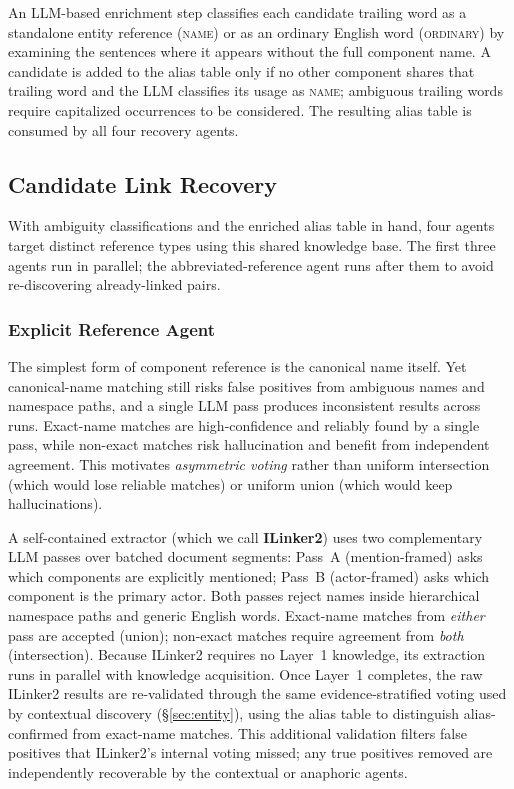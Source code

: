An LLM-based enrichment step classifies each candidate trailing
word as a standalone entity reference (\textsc{name}) or as an
ordinary English word (\textsc{ordinary}) by examining the
sentences where it appears without the full component name.
A candidate is added to the alias table only if no other
component shares that trailing word and the LLM classifies
its usage as \textsc{name};
ambiguous trailing words require capitalized occurrences
to be considered.
The resulting alias table is consumed by all four recovery agents.


\subsection{Candidate Link Recovery}\label{sec:recovery}

With ambiguity classifications and the enriched alias table in hand,
four agents target distinct reference types using this shared
knowledge base.
The first three agents run in parallel; the abbreviated-reference
agent runs after them to avoid re-discovering already-linked pairs.

\subsubsection{Explicit Reference Agent}\label{sec:seed}

The simplest form of component reference is the canonical name itself.
Yet canonical-name matching still risks false positives from ambiguous
names and namespace paths, and a single LLM pass produces
inconsistent results across runs.
Exact-name matches are high-confidence and reliably found by a
single pass, while non-exact matches risk hallucination and benefit
from independent agreement.
This motivates \emph{asymmetric voting} rather than uniform
intersection (which would lose reliable matches) or uniform union
(which would keep hallucinations).

A self-contained extractor (which we call \textbf{ILinker2}) uses two
complementary LLM passes over batched document segments:
Pass~A (mention-framed) asks which components are explicitly
mentioned; Pass~B (actor-framed) asks which component is the
primary actor.
Both passes reject names inside hierarchical namespace paths and
generic English words.
Exact-name matches from \emph{either} pass are accepted (union);
non-exact matches require agreement from \emph{both}
(intersection).
Because ILinker2 requires no Layer~1 knowledge, its extraction
runs in parallel with knowledge acquisition.
Once Layer~1 completes, the raw ILinker2 results are
re-validated through the same evidence-stratified voting used by
contextual discovery (\S\ref{sec:entity}), using the alias table
to distinguish alias-confirmed from exact-name matches.
This additional validation filters false positives that
ILinker2's internal voting missed; any true positives removed
are independently recoverable by the contextual or anaphoric
agents.

